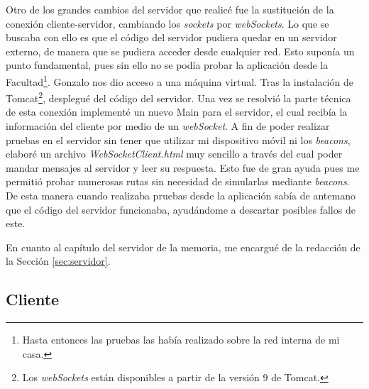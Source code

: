Otro de los grandes cambios del servidor que realicé fue la sustitución de la conexión cliente-servidor, cambiando los \textit{sockets} por \textit{webSockets}. Lo que se buscaba con ello es que el código del servidor pudiera quedar en un servidor externo, de manera que se pudiera acceder desde cualquier red. Esto suponía un punto fundamental, pues sin ello no se podía probar la aplicación desde la Facultad\footnote{Hasta entonces las pruebas las había realizado sobre la red interna de mi casa.}. Gonzalo nos dio acceso a una máquina virtual. Tras la instalación de Tomcat\footnote{Los \textit{webSockets} están disponibles a partir de la versión $9$ de Tomcat.}, desplegué del código del servidor. Una vez se resolvió la parte técnica de esta conexión implementé un nuevo Main para el servidor, el cual recibía la información del cliente por medio de un \textit{webSocket}. A fin de poder realizar pruebas en el servidor sin tener que utilizar mi dispositivo móvil ni los \textit{beacons}, elaboré un archivo \textit{WebSocketClient.html} muy sencillo a través del cual poder mandar mensajes al servidor y leer su respuesta. Esto fue de gran ayuda pues me permitió probar numerosas rutas sin necesidad de simularlas mediante \textit{beacons}. De esta manera cuando realizaba pruebas desde la aplicación sabía de antemano que el código del servidor funcionaba, ayudándome a descartar posibles fallos de este. 

En cuanto al capítulo del servidor de la memoria, me encargué de la redacción de la Sección \ref{sec:servidor}.

\subsection{Cliente}

